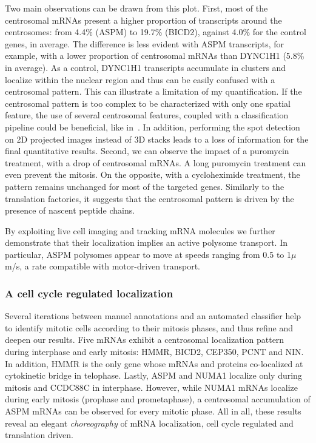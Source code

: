 Two main observations can be drawn from this plot.
First, most of the centrosomal \ac{mRNA}s present a higher proportion of transcripts around the centrosomes: from 4.4\% (ASPM) to 19.7\% (BICD2), against 4.0\% for the control genes, in average.
The difference is less evident with ASPM transcripts, for example, with a lower proportion  of centrosomal \ac{mRNA}s than DYNC1H1 (5.8\% in average).
As a control, DYNC1H1 transcripts accumulate in clusters and localize within the nuclear region and thus can be easily confused with a centrosomal pattern.
This can illustrate a limitation of my quantification.
If the centrosomal pattern is too complex to be characterized with only one spatial feature, the use of several centrosomal features, coupled with a classification pipeline could be beneficial, like in~\cite{CHOUAIB_2020}.
In addition, performing the spot detection on 2D projected images instead of 3D stacks leads to a loss of information for the final quantitative results.
Second, we can observe the impact of a puromycin treatment, with a drop of centrosomal \ac{mRNA}s.
A long puromycin treatment can even prevent the mitosis.
On the opposite, with a cycloheximide treatment, the pattern remains unchanged for most of the targeted genes.
Similarly to the translation factories, it suggests that the centrosomal pattern is driven by the presence of nascent peptide chains.

By exploiting live cell imaging and tracking \ac{mRNA} molecules we further demonstrate that their localization implies an active polysome transport.
In particular, ASPM polysomes appear to move at speeds ranging from 0.5 to 1$\mu$m/s, a rate compatible with motor-driven transport.

\subsubsection{A cell cycle regulated localization}

Several iterations between manuel annotations and an automated classifier help to identify mitotic cells according to their mitosis phases, and thus refine and deepen our results.
Five \ac{mRNA}s exhibit a centrosomal localization pattern during interphase and early mitosis: HMMR, BICD2, CEP350, PCNT and NIN.
In addition, HMMR is the only gene whose \ac{mRNA}s and proteins co-localized at cytokinetic bridge in telophase.
Lastly, ASPM and NUMA1 localize only during mitosis and CCDC88C in interphase.
However, while NUMA1 \ac{mRNA}s localize during early mitosis (prophase and prometaphase), a centrosomal accumulation of ASPM \ac{mRNA}s can be observed for every mitotic phase.
All in all, these results reveal an elegant \emph{choreography} of \ac{mRNA} localization, cell cycle regulated and translation driven.

